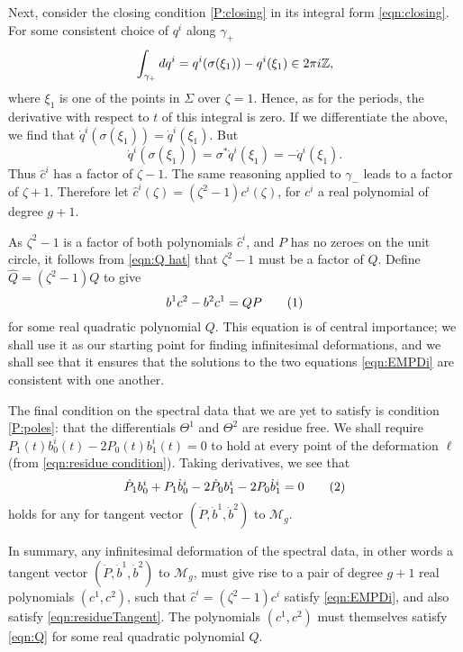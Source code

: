 \documentclass{article}
\begin{document}
Next, consider the closing condition \ref{P:closing} in its integral form \eqref{eqn:closing}. For some consistent choice of $q^i$ along $\gamma_+$
\[
\int_{\gamma_+} dq^i = q^i(\sigma(\xi_1)) - q^i(\xi_1) \in 2\pi i \mathbb{Z},
\]
where $\xi_1$ is one of the points in $\Sigma$ over $\zeta=1$. Hence, as for the periods, the derivative with respect to $t$ of this integral is zero. If we differentiate the above, we find that $\dot q^i(\sigma(\xi_1)) = \dot q^i(\xi_1)$. But
\[
\dot{q}^i(\sigma(\xi_1)) = \sigma^* \dot{q}^i (\xi_1) = - \dot{q}^i(\xi_1).
\]
Thus $\hat c^i$ has a factor of $\zeta-1$. The same reasoning applied to $\gamma_-$ leads to a factor of $\zeta+1$. Therefore let $\hat c^i(\zeta) = (\zeta^2 - 1) c^i(\zeta)$, for $c^i$ a real polynomial of degree $g+1$.

As $\zeta^2-1$ is a factor of both polynomials $\hat{c}^i$, and $P$ has no zeroes on the unit circle, it follows from \eqref{eqn:Q hat} that $\zeta^2-1$ must be a factor of $\hat{Q}$. Define $\hat Q = (\zeta^2-1)Q$ to give
\[
b^1 c^2 - b^2 c^1 = Q P
\labelthis{eqn:Q}
\]
for some real quadratic polynomial $Q$. This equation is of central importance; we shall use it as our starting point for finding infinitesimal deformations, and we shall see that it ensures that the solutions to the two equations \eqref{eqn:EMPDi} are consistent with one another.

The final condition on the spectral data that we are yet to satisfy is condition \ref{P:poles}: that the differentials $\Theta^1$ and $\Theta^2$ are residue free. We shall require $P_1(t)b^i_0(t) - 2P_0(t)b^i_1(t) = 0$ to hold at every point of the deformation $\ell$ (from \eqref{eqn:residue condition}). Taking derivatives, we see that
\[
\dot{P}_1 b^i_0 + P_1 \dot{b}^i_0 - 2 \dot{P}_0 b^i_1 - 2 P_0 \dot{b}^i_1 = 0 \labelthis{eqn:residueTangent}
\]
holds for any for tangent vector $(\dot{P}, \dot{b}^1, \dot{b}^2)$ to $\mathcal{M}_g$.

In summary, any infinitesimal deformation of the spectral data, in other words a tangent vector $(\dot P, \dot b^1, \dot b^2)$ to $\mathcal{M}_g$, must give rise to a pair of degree $g+1$ real polynomials $(c^1,c^2)$, such that $\hat{c}^i = (\zeta^2-1)c^i$ satisfy \eqref{eqn:EMPDi}, and also satisfy \eqref{eqn:residueTangent}. The polynomials $(c^1,c^2)$ must themselves satisfy \eqref{eqn:Q} for some real quadratic polynomial $Q$.
\end{document}
